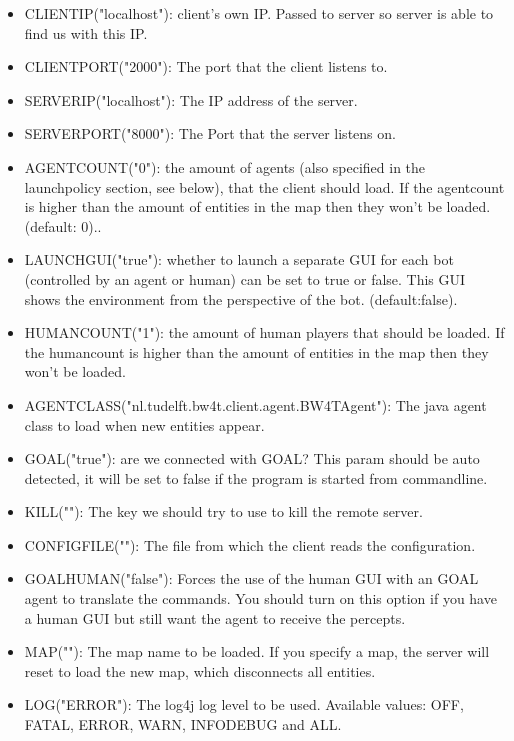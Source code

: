 \documentclass[11pt,a4paper]{article}
\begin{document}
\begin{itemize}
\item

    CLIENTIP("localhost"):    client's own IP. Passed to server so server is able to find us with this IP. 

\item
    CLIENTPORT("2000"):   The port that the client listens to. 


\item
    SERVERIP("localhost"):
 The IP address of the server. 
  
\item
    SERVERPORT("8000"):
   The Port that the server listens on. 

\item
    AGENTCOUNT("0"):
 the amount of agents (also specified in the launchpolicy section, see below), that the client should load. If the agentcount is higher than the amount of entities in the map then they won't be loaded. (default: 0).. 
    
\item
    LAUNCHGUI("true"):
    whether to launch a separate GUI for each bot (controlled by an agent or human) can be set to true or false. This GUI shows the environment from the perspective of the bot. (default:false).


\item
    HUMANCOUNT("1"):
    the amount of human players that should be loaded. If the humancount is higher than the amount of entities in the map then they won't be loaded. 

\item
    AGENTCLASS("nl.tudelft.bw4t.client.agent.BW4TAgent"):
    The java agent class to load when new entities appear.
   

\item
    GOAL("true"):
    are we connected with GOAL? This param should be auto detected, it will be set to false if the program is started from commandline.

\item
    KILL(""):
  The key we should try to use to kill the remote server.
 
\item
    CONFIGFILE(""):
    The file from which the client reads the configuration.
 
\item
    GOALHUMAN("false"):
    Forces the use of the human GUI with an GOAL agent to translate the commands. You should turn on this option if you have a human GUI but still want the agent to receive the percepts.

\item
    MAP(""):
    The map name to be loaded. If you specify a map, the server will reset to load the new map, which disconnects all entities.
     
\item    
    LOG("ERROR"):
    The log4j log level to be used. Available values: OFF, FATAL, ERROR, WARN, INFODEBUG and ALL.

\end{itemize}
\end{document}
